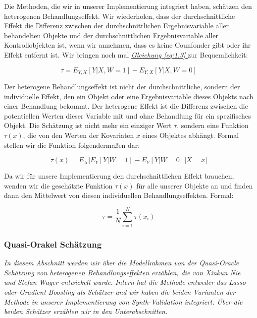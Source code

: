 \documentclass[12pt,a4paper,twoside]{scrartcl}
\numberwithin{equation}{section}
\renewcommand*{\refeq}[1]{\emph{\hyperref[#1]{Gleichung \ref*{#1} }}}
\begin{document}
Die Methoden, die wir in unserer Implementierung integriert haben, schätzen den heterogenen Behandlungseffekt. Wir wiederholen, dass der durchschnittliche Effekt die Differenz zwischen der durchschnittlichen Ergebnisvariable aller behandelten Objekte und der durchschnittlichen Ergebnisvariable aller Kontrollobjekten ist, wenn wir annehmen, dass es keine Counfonder gibt oder ihr Effekt entfernt ist. Wir bringen noch mal \refeq{eq:1.3} zur Bequemlichkeit:\par  

\begin{equation}\label{eq:2.11}
  \tau = E_{Y,X}[Y|X,W = 1] - E_{Y,X}[Y|X,W = 0]
\end{equation}

\noindent
Der heterogene Behandlungseffekt ist nicht der durchschnittliche, sondern der individuelle Effekt, den ein Objekt oder eine Ergebnisvariable dieses Objekts nach einer Behandlung bekommt. Der heterogene Effekt ist die Differenz zwischen die potentiellen Werten dieser Variable mit und ohne Behandlung für ein spezifisches Objekt. Die  Schätzung ist nicht mehr ein einziger Wert $\tau$, sondern eine Funktion $\tau(x)$, die von den Werten der Kovariaten $x$ eines Objektes abhängt. Formal stellen wir die Funktion folgendermaßen dar:\par

\begin{equation}\label{eq:2.12}
  \tau(x) = E_X \Big [ E_{Y}[Y|W = 1] - E_{Y}[Y|W = 0] \Big | X=x \Big ]
\end{equation}

\noindent
Da wir für unsere Implementierung den durchschnittlichen Effekt brauchen, wenden wir die geschätzte Funktion $\tau(x)$ für alle unserer Objekte an und finden dann den Mittelwert von diesen individuellen Behandlungseffekten. Formal:\par

\begin{equation}\label{eq:2.13}
  \tau = \frac{1}{N} \sum_{i=1}^{N} \tau(x_i)
\end{equation}
  
\subsubsection{Quasi-Orakel Schätzung}\label{subsubsec:quasioracle}
\noindent
\emph{In diesem Abschnitt werden wir über die Modellrahmen von der Quasi-Oracle Schätzung von heterogenen Behandlungseffekten\cite{nie2017quasi} erzählen, die von Xinkun Nie und Stefan Wager entwickelt wurde. Intern hat die Methode entweder das Lasso oder Gradient Boosting als Schätzer und wir haben die beiden Varianten der Methode in unserer Implementierung von Synth-Validation integriert. Über die beiden Schätzer erzählen wir in den Unterabschnitten.}\par  
\end{document}
